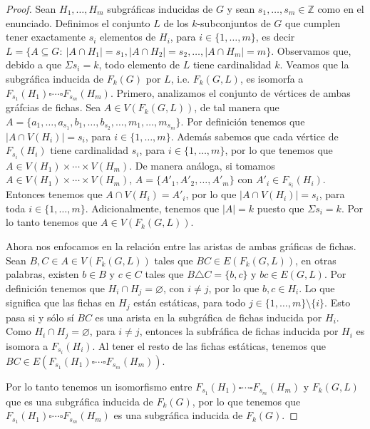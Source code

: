 \begin{proof}
    Sean $H_1, \dots, H_m$ subgr\'aficas inducidas de  $G$ y sean $s_1,
    \dots, s_m \in \mathbb{Z}$ como en el enunciado. Definimos el
    conjunto $L$ de los $k$-subconjuntos de $G$ que cumplen tener
    exactamente $s_i$ elementos de $H_i$, para $i \in \{1, \dots, m\}$,
    es decir $L = \{A \subseteq G \colon\ |A\cap H_1|=s_1 , |A \cap
    H_2|=s_2, \dots, |A \cap H_m|=m \}$. Observamos que, debido a  que
    $\Sigma s_i = k$, todo elemento de $L$ tiene cardinalidad $k$.
    Veamos que la subgr\'afica inducida de $F_k(G)$ por $L$, i.e. $F_k(G,L)$,
    es isomorfa a $F_{s_1}(H_1) \square \cdots \square F_{s_m}(H_m)$.
    Primero, analizamos el conjunto de v\'ertices de ambas
    gr\'afcias de fichas. Sea $A \in V(F_k(G,L))$, de tal manera que $A=\{a_1,
    \dots, a_{s_1}, b_1,\dots, b_{s_2}, \dots, m_1, \dots, m_{s_m}\}$.
    Por definici\'on tenemos que $|A \cap V(H_i)|= s_i$, para $i \in
    \{1, \dots, m\}$. Adem\'as sabemos que cada v\'ertice de
    $F_{s_i}(H_i)$ tiene cardinalidad $s_i$, para $i \in \{1, \dots,
    m\}$, por lo que tenemos que $A \in V(H_1) \times \cdots \times
    V(H_m)$. De manera an\'aloga, si tomamos $A \in V(H_1) \times \cdots
    \times V(H_m)$, $A = \{A'_1, A'_2, \dots, A'_m\}$ con $A'_i \in
    F_{s_i}(H_i)$. Entonces tenemos que $A \cap V(H_i) = A'_i$, por lo
    que $|A \cap V(H_i)|= s_i$, para toda $i \in \{1, \dots, m\}$.
    Adicionalmente, tenemos que $|A|= k$ puesto que $\Sigma s_i = k$.
    Por lo tanto tenemos que $A \in V(F_k(G,L))$.

    Ahora nos enfocamos en la relaci\'on entre las aristas de ambas
    gr\'aficas de fichas. Sean $B, C \in A \in V(F_k(G,L))$ tales que
    $BC \in E(F_k(G,L))$, en otras palabras, existen $b \in B$ y $c \in
    C$ tales que $B \triangle C = \{b, c\}$ y $bc \in E(G,L)$. Por
    definici\'on tenemos que $H_i \cap H_j = \varnothing$, con $i \neq
    j$, por lo que $b, c \in H_i$. Lo que significa que las fichas en
    $H_j$ est\'an est\'aticas, para todo $j \in \{1, \dots, m\} \setminus
    \{i\}$. Esto pasa si y s\'olo s\'i $BC$ es una arista en la
    subgr\'afica de fichas inducida por $H_i$. Como $H_i \cap H_j =
    \varnothing$, para $i \neq j$, entonces la subfr\'afica de fichas
    inducida por $H_i$ es isomora a $F_{s_i}(H_i)$. Al tener el resto de
    las fichas est\'aticas, tenemos que $BC \in E(F_{s_1}(H_1) \square
    \cdots \square F_{s_m}(H_m))$.

    Por lo tanto tenemos un isomorfismo entre $F_{s_1}(H_1) \square
    \cdots \square F_{s_m}(H_m)$ y $F_k(G,L)$ que es una subgr\'afica
    inducida de $F_k(G)$, por lo que tenemos que $F_{s_1}(H_1) \square
    \cdots \square F_{s_m}(H_m)$ es una subgr\'afica inducida de
    $F_k(G)$.
\end{proof}

